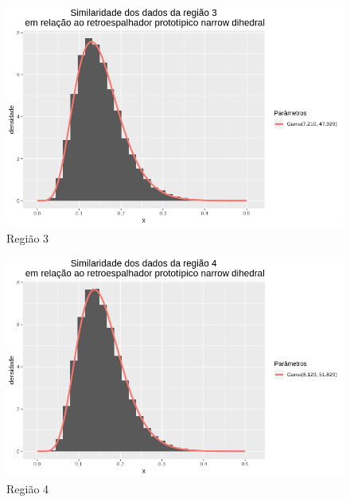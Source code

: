 \documentclass[12pt]{article}
\begin{document}
\begin{figure}[!h]
    \centering
    \vspace{0.1\linewidth}
    \includegraphics[width = \linewidth]{../../Images/Report_18_12_20/nd_region3.png}
    \caption{Região 3}
    \label{fig:nd_r3}
\end{figure}

\begin{figure}[!h]
    \centering
    \vspace{0.1\linewidth}
    \includegraphics[width = \linewidth]{../../Images/Report_18_12_20/nd_region4.png}
    \caption{Região 4}
    \label{fig:nd_r4}
\end{figure}
\end{document}
